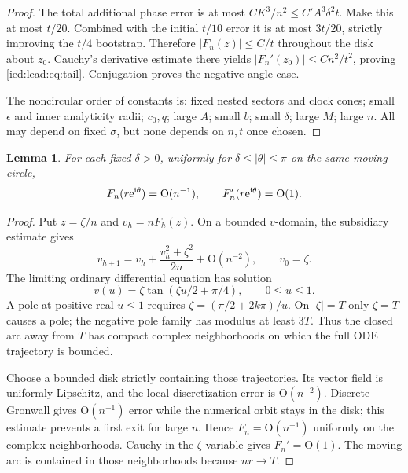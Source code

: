 \documentclass[11pt,letterpaper]{article}
\newtheorem{lemma}[theorem]{Lemma}
\theoremstyle{remark}\newtheorem{remark}[theorem]{Remark}
\newcommand{\ii}{\mathrm i}\newcommand{\dd}{\,\mathrm d}
\newcommand{\Oh}{\mathrm O}\newcommand{\supp}{\operatorname{supp}}
\begin{document}
\begin{proof}
The total additional phase error is at most $CK^3/n^2\le C'A^3\delta^2t$. Make this at most $t/20$. Combined with the initial $t/10$ error it is at most $3t/20$, strictly improving the $t/4$ bootstrap. Therefore $|F_n(z)|\le C/t$ throughout the disk about $z_0$. Cauchy's derivative estimate there yields $|F_n'(z_0)|\le Cn^2/t^2$, proving \eqref{ied:lead:eq:tail}. Conjugation proves the negative-angle case.

The noncircular order of constants is: fixed nested sectors and clock cones; small $\epsilon$ and inner analyticity radii; $c_0,q$; large $A$; small $b$; small $\delta$; large $M$; large $n$. All may depend on fixed $\sigma$, but none depends on $n,t$ once chosen.
\end{proof}

\begin{lemma}\label{ied:lead:lem:outer}
For each fixed $\delta>0$, uniformly for $\delta\le|\theta|\le\pi$ on the same moving circle,
\begin{equation}\label{ied:lead:eq:outer}
 F_n(r\e^{\ii\theta})=\Oh(n^{-1}),\qquad
 F_n'(r\e^{\ii\theta})=\Oh(1).
\end{equation}
\end{lemma}
\begin{proof}
Put $z=\zeta/n$ and $v_h=nF_h(z)$. On a bounded $v$-domain, the subsidiary estimate gives
\[
 v_{h+1}=v_h+\frac{v_h^2+\zeta^2}{2n}+\Oh(n^{-2}),
 \qquad v_0=\zeta.
\]
The limiting ordinary differential equation has solution
\[
 v(u)=\zeta\tan(\zeta u/2+\pi/4),\qquad0\le u\le1.
\]
A pole at positive real $u\le1$ requires $\zeta=(\pi/2+2k\pi)/u$. On $|\zeta|=T$ only $\zeta=T$ causes a pole; the negative pole family has modulus at least $3T$. Thus the closed arc away from $T$ has compact complex neighborhoods on which the full ODE trajectory is bounded.

Choose a bounded disk strictly containing those trajectories. Its vector field is uniformly Lipschitz, and the local discretization error is $\Oh(n^{-2})$. Discrete Gronwall gives $\Oh(n^{-1})$ error while the numerical orbit stays in the disk; this estimate prevents a first exit for large $n$. Hence $F_n=\Oh(n^{-1})$ uniformly on the complex neighborhoods. Cauchy in the $\zeta$ variable gives $F_n'=\Oh(1)$. The moving arc is contained in those neighborhoods because $nr\to T$.
\end{proof}
\end{document}
